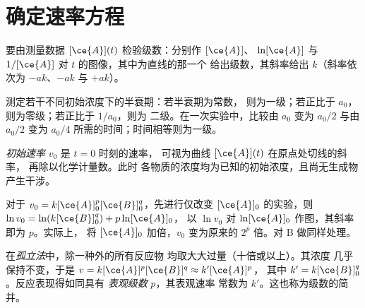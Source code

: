 \section{确定速率方程}

\begin{method}[积分法]\label{met:b1:rate-laws:integral}
要由测量数据 $[\ce{A}](t)$ 检验级数：分别作 $[\ce{A}]$、
$\ln[\ce{A}]$ 与 $1/[\ce{A}]$ 对 $t$ 的图像，其中为直线的那一个
给出级数，其斜率给出 $k$（斜率依次为 $-ak$、$-ak$
与 $+ak$）。
\end{method}

\begin{method}[半衰期法]\label{met:b1:rate-laws:half-life}
测定若干不同初始浓度下的半衰期：若半衰期为常数，
则为一级；若正比于 $a_0$，则为零级；若正比于 $1/a_0$，则为
二级。在一次实验中，比较由 $a_0$ 变为 $a_0/2$
与由 $a_0/2$ 变为 $a_0/4$ 所需的时间；时间相等则为一级。
\end{method}

\begin{definition}[初始速率]\label{def:b1:rate-laws:initial-rate}
\emph{初始速率} $v_0$ 是 $t = 0$ 时刻的速率，
可视为曲线 $[\ce{A}](t)$ 在原点处切线的斜率，
再除以化学计量数。此时
各物质的浓度均为已知的初始浓度，且尚无生成物产生干涉。
\end{definition}

\begin{method}[初始速率法]\label{met:b1:rate-laws:initial-rates}
对于 $v_0 = k[\ce{A}]_0^p[\ce{B}]_0^q$，先进行仅改变
$[\ce{A}]_0$ 的实验，则 $\ln v_0 = \ln(k[\ce{B}]_0^q) + p\ln[\ce{A}]_0$，
以 $\ln v_0$ 对 $\ln[\ce{A}]_0$ 作图，其斜率即为 $p$。实际上，
将 $[\ce{A}]_0$ 加倍，$v_0$ 变为原来的 $2^p$ 倍。对 B 做同样处理。
\end{method}

\begin{definition}\label{def:b1:rate-laws:apparent-order}
在\emph{孤立法}中，除一种外的所有反应物
均取大大过量（十倍或以上）。其浓度
几乎保持不变，于是 $v = k[\ce{A}]^p[\ce{B}]^q \approx k'[\ce{A}]^p$，
其中 $k' = k[\ce{B}]_0^q$。反应表现得如同具有
\emph{表观级数} $p$，其表观速率
常数为 $k'$。这也称为级数的简并。
\end{definition}

